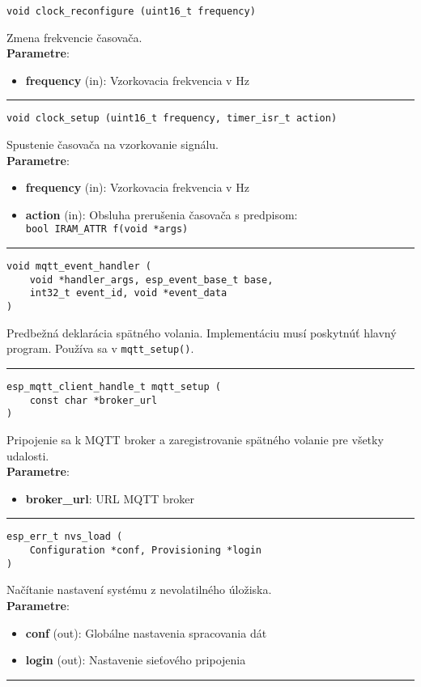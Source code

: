 \begin{lstlisting}[style=docs]
void clock_reconfigure (uint16_t frequency)
\end{lstlisting}
   Zmena frekvencie časovača. \\
\textbf{Parametre}:
\begin{itemize}[noitemsep, topsep=0pt]
	\item \textbf{frequency} (in):	Vzorkovacia frekvencia v Hz 
\end{itemize}
\bigbreak
\hrule

\begin{lstlisting}[style=docs]
void clock_setup (uint16_t frequency, timer_isr_t action)
\end{lstlisting}
   Spustenie časovača na vzorkovanie signálu. \\
\textbf{Parametre}:
\begin{itemize}[noitemsep, topsep=0pt]
	\item \textbf{frequency} (in): Vzorkovacia frekvencia v Hz
	\item \textbf{action} (in):	Obsluha prerušenia časovača s predpisom: \\ \verb|bool IRAM_ATTR f(void *args)|
\end{itemize}
\bigbreak
\hrule

\begin{lstlisting}[style=docs]
void mqtt_event_handler (
	void *handler_args, esp_event_base_t base, 
	int32_t event_id, void *event_data
)
\end{lstlisting}
Predbežná deklarácia spätného volania. Implementáciu musí poskytnúť hlavný program. Používa sa v \verb|mqtt_setup()|. \\
\bigbreak
\hrule

\begin{lstlisting}[style=docs]
esp_mqtt_client_handle_t mqtt_setup (
	const char *broker_url
)
\end{lstlisting}
   Pripojenie sa k MQTT broker a zaregistrovanie spätného volanie pre všetky udalosti. \\
\textbf{Parametre}:
\begin{itemize}[noitemsep, topsep=0pt]
	\item \textbf{broker\_url}: URL MQTT broker 
\end{itemize}
\bigbreak
\hrule

\begin{lstlisting}[style=docs]
esp_err_t nvs_load (
	Configuration *conf, Provisioning *login
)
\end{lstlisting}
   Načítanie nastavení systému z nevolatilného úložiska. \\
\textbf{Parametre}:
\begin{itemize}[noitemsep, topsep=0pt]
	\item \textbf{conf} (out): Globálne nastavenia spracovania dát
	\item \textbf{login} (out): Nastavenie sieťového pripojenia
\end{itemize}
\bigbreak
\hrule

